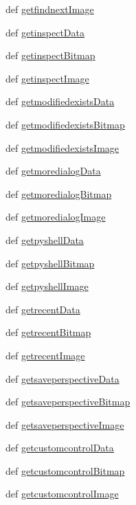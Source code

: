 \begin{DoxyCompactItemize}
\item 
def \hyperlink{namespaceimages_a8bf08ffd31da9168b3f793df37e9dc76}{getfindnextImage}
\item 
def \hyperlink{namespaceimages_a8aa9464fa73a856b468f24c33b98a0a5}{getinspectData}
\item 
def \hyperlink{namespaceimages_a95ac19ef30d8018606ae816f84d18d5b}{getinspectBitmap}
\item 
def \hyperlink{namespaceimages_ab010b84c06594546f384ae7fa79a0fa8}{getinspectImage}
\item 
def \hyperlink{namespaceimages_aa069ff65d8c53687c9358a838ce7ea58}{getmodifiedexistsData}
\item 
def \hyperlink{namespaceimages_a34689c0d5a3888ab0b14ffa979120783}{getmodifiedexistsBitmap}
\item 
def \hyperlink{namespaceimages_a8058c133cbd727175f9bf5bcccb4e69f}{getmodifiedexistsImage}
\item 
def \hyperlink{namespaceimages_afd92a88de50b49061f285d1709608dea}{getmoredialogData}
\item 
def \hyperlink{namespaceimages_a9bd8a2bc1d9d5424d8c1c928e9b8ca1e}{getmoredialogBitmap}
\item 
def \hyperlink{namespaceimages_aecccd20665dc27d1ffc5051bd588b2ce}{getmoredialogImage}
\item 
def \hyperlink{namespaceimages_a30b919acc7a3c962042932236cbbc135}{getpyshellData}
\item 
def \hyperlink{namespaceimages_a8809b115cc03bb1fd18c1e997ffda62a}{getpyshellBitmap}
\item 
def \hyperlink{namespaceimages_a011e62ff4886885a0fd201dc34d1129e}{getpyshellImage}
\item 
def \hyperlink{namespaceimages_a7d91a84ff79bae57a331bcec2c4a9988}{getrecentData}
\item 
def \hyperlink{namespaceimages_a1d09a0c4f10b5778e11601655eb9c7a3}{getrecentBitmap}
\item 
def \hyperlink{namespaceimages_aca99fc89c6adbf1f624e9a8bc8932c9d}{getrecentImage}
\item 
def \hyperlink{namespaceimages_adb1657e897a64cb53071cc74ed9c6b87}{getsaveperspectiveData}
\item 
def \hyperlink{namespaceimages_ada12927f6ad14ffa977e06cbd9a0e674}{getsaveperspectiveBitmap}
\item 
def \hyperlink{namespaceimages_a5d48105465a053a1c4fd3d85a98c5db7}{getsaveperspectiveImage}
\item 
def \hyperlink{namespaceimages_afb57d37a022985579a78e4e6eff7628c}{getcustomcontrolData}
\item 
def \hyperlink{namespaceimages_a6077600c5ff26254f7bf9cd570ed3ff0}{getcustomcontrolBitmap}
\item 
def \hyperlink{namespaceimages_a6a8f6adcd15aba63782b4365fb670f9b}{getcustomcontrolImage}
\end{DoxyCompactItemize}
